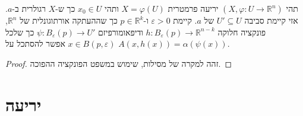 \documentclass{tstextbook}
\begin{document}
\begin{theorem}
תהי \((X,\varphi:U\to \mathbb{R}^{n})\) יריעה פרמטרית \(X=\varphi(U)\) ותהי \(x_{0} \in U\) כך ש-\(X\) רגולרית ב-\(a\). אזי קיימת סביבה \(U' \subseteq U\) של \(a\). קיימת \(\varepsilon> 0\)  ו-\(p \in \mathbb{R}^{k}\) כך שההעתקה אורתוגונלית של \(\mathbb{R}^{n}\), פונקציה חלוקה \(h:B_{\varepsilon}(p)\to \mathbb{R}^{n-k}\) ודיפאומורפיזם \(\psi:B_{\varepsilon}(p)\to U'\) כך שלכל \(x \in B(p,\varepsilon)\) אפשר להסתכל על \(A(x,h(x))=\alpha(\psi(x))\).

\end{theorem}
\begin{proof}
זהה למקרה של מסילות, שימוש במשפט הפונקציה ההפוכה.

\end{proof}
\section{יריעה}
\end{document}
